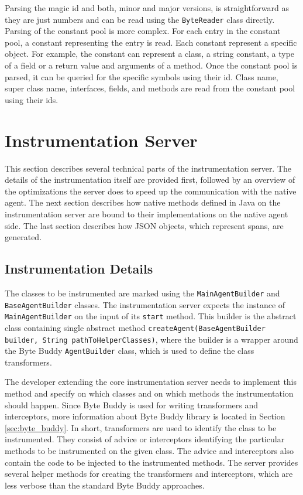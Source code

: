 Parsing the magic id and both, minor and major versions, is straightforward as they are just numbers and can be read using the \texttt{ByteReader} class directly. Parsing of the constant pool is more complex. For each entry in the constant pool, a constant representing the entry is read. Each constant represent a specific object. For example, the constant can represent a class, a string constant, a type of a field or a return value and arguments of a method. Once the constant pool is parsed, it can be queried for the specific symbols using their id. Class name, super class name, interfaces, fields, and methods are read from the constant pool using their ids.

\section{Instrumentation Server}
This section describes several technical parts of the instrumentation server. The details of the instrumentation itself are provided first, followed by an overview of the optimizations the server does to speed up the communication with the native agent. The next section describes how native methods defined in Java on the instrumentation server are bound to their implementations on the native agent side. The last section describes how JSON objects, which represent spans, are generated.

\subsection{Instrumentation Details}
\label{impl:server:instr}
The classes to be instrumented are marked using the \texttt{MainAgentBuilder} and \texttt{BaseAgentBuilder} classes.
The instrumentation server expects the instance of \texttt{MainAgentBuilder} on the input of its \texttt{start} method. This builder is the abstract class containing single abstract method \texttt{createAgent(BaseAgentBuilder builder, String pathToHelperClasses)}, where the builder is a wrapper \linebreak around the Byte Buddy \texttt{AgentBuilder} class, which is used to define the class transformers.

The developer extending the core instrumentation server needs to implement this method and specify on which classes and on which methods the instrumentation should happen. Since Byte Buddy is used for writing transformers and interceptors, more information about Byte Buddy library is located in Section \ref{sec:byte_buddy}. In short, transformers are used to identify the class to be instrumented. They consist of advice or interceptors identifying the particular methods to be instrumented on the given class. The advice and interceptors also contain the code to be injected to the instrumented methods. The server provides several helper methods for creating the transformers and interceptors, which are less verbose than the standard Byte Buddy approaches.


